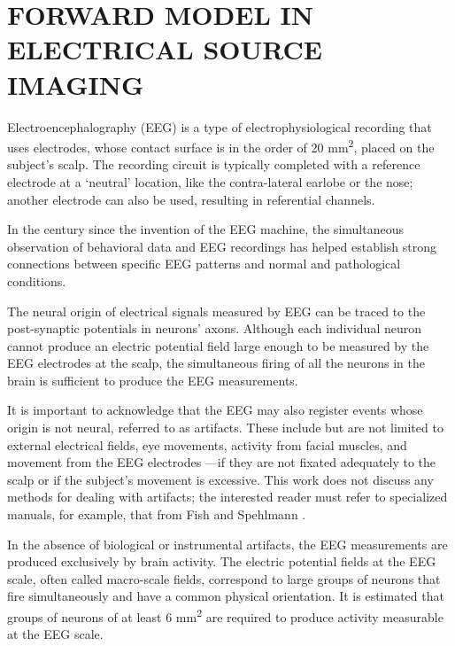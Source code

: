 \chapter{FORWARD MODEL IN ELECTRICAL SOURCE IMAGING}
\label{ch:forward}





Electroencephalography (EEG) is a type of electrophysiological recording that uses electrodes, whose contact surface is in the order of 20 \si{mm^2}, placed on the subject's scalp.
%
The recording circuit is typically completed with a reference electrode at a `neutral' location, like the contra-lateral earlobe or the nose; another electrode can also be used, resulting in referential channels. 
%

In the century since the invention of the EEG machine, the simultaneous observation of behavioral data and EEG recordings has helped establish strong connections between specific EEG patterns and normal and pathological conditions.

The neural origin of electrical signals measured by EEG can be traced to the post-synaptic potentials in neurons' axons.
%
Although each individual neuron cannot produce an electric potential field large enough to be measured by the EEG electrodes at the scalp, the simultaneous firing of all the neurons in the brain is sufficient to produce the EEG measurements.

It is important to acknowledge that the EEG may also register events whose origin is not neural, referred to as artifacts. These include but are not limited to external electrical fields, eye movements, activity from facial muscles, and movement from the EEG electrodes —if they are not fixated adequately to the scalp or if the subject's movement is excessive.
%
This work does not discuss any methods for dealing with artifacts; the interested reader must refer to specialized manuals, for example, that from Fish and Spehlmann \cite{fisch1999fisch}.

In the absence of biological or instrumental artifacts, the EEG measurements are produced exclusively by brain activity.
%
The electric potential fields at the EEG scale, often called macro-scale fields, correspond to large groups of neurons that fire simultaneously and have a common physical orientation.
%
It is estimated that groups of neurons of at least 6 \si{mm^2} are required to produce activity measurable at the EEG scale.

